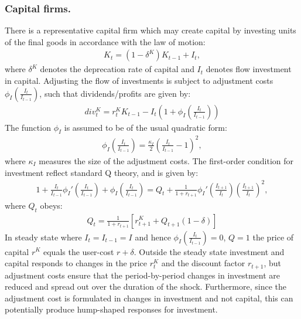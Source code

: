 
\subsubsection*{Capital firms.}
There is a representative capital firm which may create capital by investing units of the final goods in accordance with the law of motion:
\begin{gather}
K_{t}=\left(1-\delta^{K}\right)K_{t-1} + I_{t}, \label{eq:capital_accu}
\end{gather}
where $\delta^{K}$ denotes the deprecation rate of capital and $I_{t}$ denotes flow investment in capital. Adjusting the flow of investments is subject to adjustment costs $\phi_{I}\left(\frac{I_{t}}{I_{t-1}}\right)$, such that dividends/profits are given by:
\begin{gather}
div_{t}^{K}=r_{t}^{K}K_{t-1}-I_{t}\left(1+\phi_{I}\left(\frac{I_{t}}{I_{t-1}}\right)\right) \label{eq:capital_firms_profit}
\end{gather}
The function $\phi_{I}$ is assumed to be of the usual quadratic form:
\begin{gather*}
\phi_{I}\left(\frac{I_{t}}{I_{t-1}}\right)=\frac{\kappa_{I}}{2}\left(\frac{I_{t}}{I_{t-1}}-1\right)^{2},
\end{gather*}
where $\kappa_{I}$ measures the size of the adjustment costs.  
The first-order condition for investment reflect standard Q theory, and is given by:
\begin{gather*}
1+\frac{I_{t}}{I_{t-1}}\phi_{I}'\left(\frac{I_{t}}{I_{t-1}}\right)+\phi_{I}\left(\frac{I_{t}}{I_{t-1}}\right)=Q_{t}+\frac{1}{1+r_{t+1}}\phi_{I}'\left(\frac{I_{t+1}}{I_{t}}\right)\left(\frac{I_{t+1}}{I_{t}}\right)^{2},
\end{gather*}
where $Q_t$ obeys:
\begin{gather*}
Q_{t}=\frac{1}{1+r_{t+1}}\left[r_{t+1}^{K}+Q_{t+1}\left(1-\delta\right)\right]
\end{gather*}
In steady state where $I_t=I_{t-1}=I$ and hence $\phi_{I}\left(\frac{I_{t}}{I_{t-1}}\right)=0$, $Q=1$ the price of capital $r^K$ equals the user-cost $r+\delta$. Outside the steady state investment and capital responds to changes in the price $r^K_t$ and the discount factor $r_{t+1}$, but adjustment costs ensure that the period-by-period changes in investment are reduced and spread out over the duration of the shock. Furthermore, since the adjustment cost is formulated in changes in investment and not capital, this can potentially produce hump-shaped responses for investment. 

